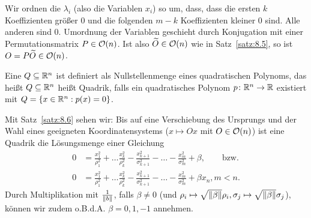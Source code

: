 \begin{beweis}
	Wir ordnen die $\lambda_i$ (also die Variablen $x_i$) so um, dass, dass die ersten $k$ Koeffizienten größer $0$ und die folgenden $m-k$ Koeffizienten kleiner $0$ sind.
	Alle anderen sind $0$.
	Umordnung der Variablen geschieht durch Konjugation mit einer Permutationsmatrix $P \in \mathcal{O}(n)$.
	Ist also $\widetilde{O} \in \mathcal{O}(n)$ wie in Satz~\ref{satz:8.5}, so ist $O = P\widetilde{O} \in \mathcal{O}(n)$. 
\end{beweis}
  
\begin{definition}[Quadrik]
	\label{def:8.7}
	Eine  $Q \subseteq \mathbb{R}^n$ ist definiert als Nullstellenmenge eines quadratischen Polynoms, das heißt $Q \subseteq \mathbb{R}^n$ heißt Quadrik, falls ein quadratisches Polynom $p \colon \mathbb{R}^n \rightarrow \mathbb{R}$ existiert mit $Q = \{x \in \mathbb{R}^n : p(x) = 0\}$.
\end{definition}

\begin{bemerkung}
	\label{bem:8.8}
	Mit Satz~\ref{satz:8.6} sehen wir:
	Bis auf eine Verschiebung des Ursprungs und der Wahl eines geeigneten Koordinatensystems ($x \mapsto Ox$ mit $O \in \mathcal{O}(n)$) ist eine Quadrik die Lösungsmenge einer Gleichung
	\begin{align*}
		0 &= \frac{x_1^2}{\rho_1^2} + \dots \frac{x_k^2}{\rho_k^2} - \frac{x_{k+1}^2}{\sigma_{k+1}^2} - \dots - \frac{x_m^2}{\sigma_m^2} + \beta, \qquad \text{bzw.} \\
		0 &= \frac{x_1^2}{\rho_1^2} + \dots \frac{x_k^2}{\rho_k^2} - \frac{x_{k+1}^2}{\sigma_{k+1}^2} - \dots - \frac{x_m^2}{\sigma_m^2} + \beta x_n, m < n.
	\end{align*}
	Durch Multiplikation mit $\frac{1}{\left\lVert b\right\rVert}$, falls $\beta \neq 0$ (und $\rho_i \mapsto \sqrt{\left\lVert\beta\right\rVert} \rho_i, \sigma_j \mapsto \sqrt{\left\lVert\beta\right\rVert} \sigma_j$), können wir zudem o.B.d.A. $\beta = 0, 1, -1$ annehmen.
\end{bemerkung}

